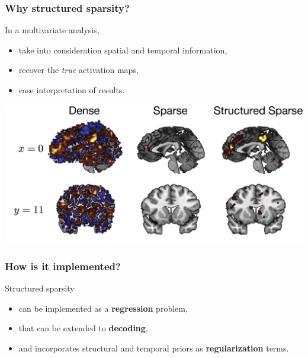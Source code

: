 \documentclass[11pt]{beamer}
\begin{document}
\begin{frame}[t]
  \frametitle{Why structured sparsity?}
  In a multivariate analysis,
  \begin{itemize}
  \item take into consideration spatial and temporal information,
  \item recover the \emph{true} activation maps,
  \item ease interpretation of results.
  \end{itemize}
  \begin{center}
    \includegraphics[scale=0.1]{figures/grosenick_fig1_tbg.png}
  \end{center}
\end{frame}
\begin{frame}
  \frametitle{How is it implemented?}
  Structured sparsity
  \begin{itemize}
  \item can be implemented as a \textbf{regression} problem,
  \item that can be extended to \textbf{decoding},
  \item and incorporates structural and temporal priors as
    \textbf{regularization} terms.
  \end{itemize}
\end{frame}
\end{document}
